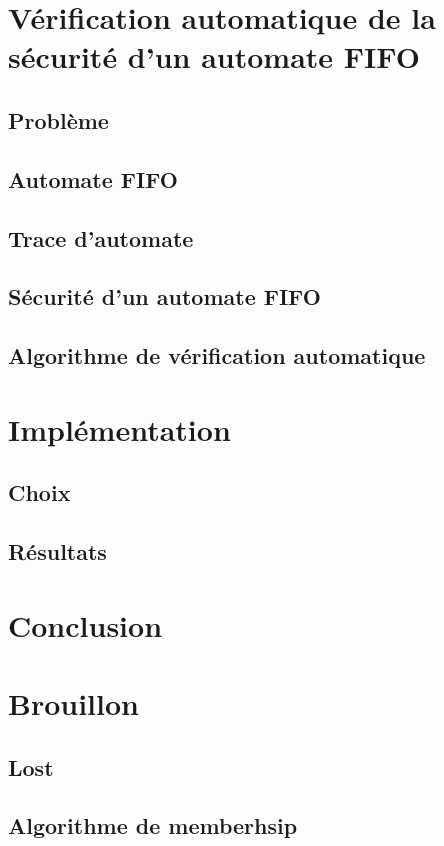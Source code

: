 	\chapter{Vérification automatique de la sécurité d'un automate FIFO}\label{ch:learning}
	\section{Problème}\label{sec:prob}%
	\section{Automate FIFO}\label{sec:fifo}
	\section{Trace d'automate}\label{sec:trace}%
	\section{Sécurité d'un automate FIFO}\label{sec:unsafe}%
	\section{Algorithme de vérification automatique}\label{sec:algo}%

	\chapter{Implémentation}\label{ch:impl}
	\section{Choix}\label{sec:choix}
	\section{Résultats}\label{sec:res}

	\chapter{Conclusion}\label{ch:ccl}

	\chapter{Brouillon}	
	\section{Lost}
	\section{Algorithme de memberhsip}

	\newpage
	
	


